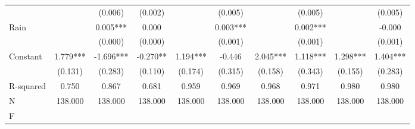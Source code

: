 {\begin{tabular}{l*{9}{c}}
                    &               &     (0.006)   &     (0.002)   &               &     (0.005)   &               &     (0.005)   &               &     (0.005)   \\
Rain                &               &       0.005***&       0.000   &               &       0.003***&               &       0.002***&               &      -0.000   \\
                    &               &     (0.000)   &     (0.000)   &               &     (0.001)   &               &     (0.001)   &               &     (0.001)   \\
Constant            &       1.779***&      -1.696***&      -0.270** &       1.194***&      -0.446   &       2.045***&       1.118***&       1.298***&       1.404***\\
                    &     (0.131)   &     (0.283)   &     (0.110)   &     (0.174)   &     (0.315)   &     (0.158)   &     (0.343)   &     (0.155)   &     (0.283)   \\
\hline
R-squared           &       0.750   &       0.867   &       0.681   &       0.959   &       0.969   &       0.968   &       0.971   &       0.980   &       0.980   \\
N                   &     138.000   &     138.000   &     138.000   &     138.000   &     138.000   &     138.000   &     138.000   &     138.000   &     138.000   \\
F                   &               &               &               &               &               &               &               &               &               \\
\hline\hline
\end{tabular}
}
